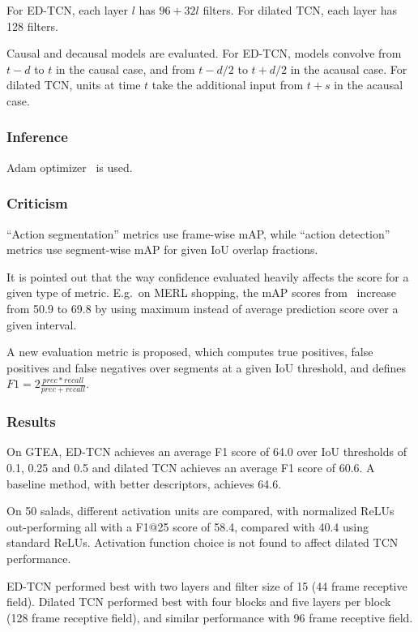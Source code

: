 \documentclass[a4paper, 12pt]{article}
\begin{document}
For ED-TCN, each layer $l$ has $96 + 32l$ filters. For dilated TCN, each layer
has 128 filters.

Causal and decausal models are evaluated. For ED-TCN, models convolve from $t -
d$ to $t$ in the causal case, and from $t - d/2$ to $t + d/2$ in the acausal
case. For dilated TCN, units at time $t$ take the additional input from $t + s$
in the acausal case.

\subsubsection{Inference}

Adam optimizer~\citet{DBLP:journals/corr/KingmaB14} is used.

\subsubsection{Criticism}

``Action segmentation'' metrics use frame-wise mAP, while ``action detection''
metrics use segment-wise mAP for given IoU overlap fractions.

It is pointed out that the way confidence evaluated heavily affects the score
for a given type of metric. E.g.\ on MERL shopping, the mAP scores
from~\citet{merl-shopping-singh} increase from 50.9 to 69.8 by using maximum
instead of average prediction score over a given interval.

A new evaluation metric is proposed, which computes true positives, false
positives and false negatives over segments at a given IoU threshold, and defines
$F1 = 2\frac{prec * recall}{prec + recall}$.

\subsubsection{Results}

On GTEA, ED-TCN achieves an average F1 score of 64.0 over IoU thresholds of
0.1, 0.25 and 0.5 and dilated TCN achieves an average F1 score of 60.6. A
baseline method, with better descriptors, achieves 64.6.

On 50 salads, different activation units are compared, with normalized ReLUs
out-performing all with a F1@25 score of 58.4, compared with 40.4 using
standard ReLUs. Activation function choice is not found to affect dilated TCN
performance.

ED-TCN performed best with two layers and filter size of 15 (44 frame receptive
field). Dilated TCN performed best with four blocks and five layers per block
(128 frame receptive field), and similar performance with 96 frame receptive
field.
\end{document}

